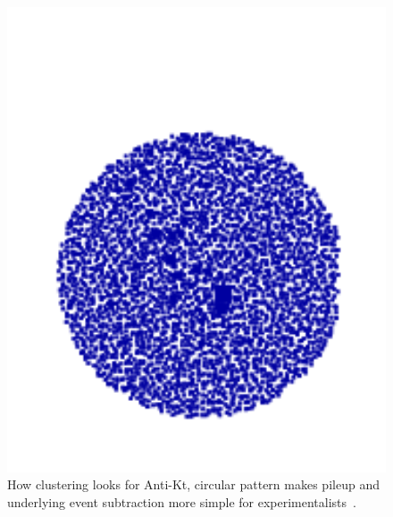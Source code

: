 \begin{figure}[htb]
\centering
\includegraphics[width=1.0\textwidth]{visuals/figs_subjet-plots-antikt.png}
\caption{How clustering looks for Anti-Kt, circular pattern makes pileup and underlying event subtraction more simple for experimentalists~\cite{Dreyer:2018nbf}.}
\label{fig:lund}
\end{figure}

